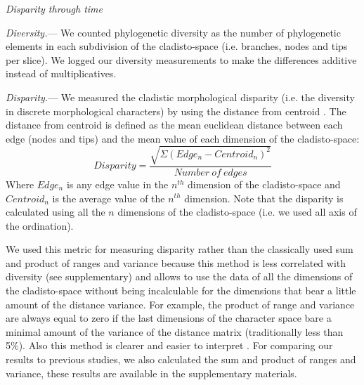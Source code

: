 \documentclass[12pt,letterpaper]{article}
\renewcommand{\subsection}[1]{%
\bigskip
\begin{center}
\begin{large}
\normalfont\itshape #1
\end{large}
\end{center}}
\renewcommand{\subsubsection}[1]{%
\vspace{2ex}
\noindent
\textit{#1.}---}
\begin{document}
\subsection{Disparity through time}
\subsubsection{Diversity}
We counted phylogenetic diversity as the number of phylogenetic elements in each subdivision of the cladisto-space (i.e. branches, nodes and tips per slice). We logged our diversity measurements to make the differences additive instead of multiplicatives.

\subsubsection{Disparity}
We measured the cladistic morphological disparity (i.e. the diversity in discrete morphological characters) by using the distance from centroid \citep{finlay2015morphological}. The distance from centroid is defined as the mean euclidean distance between each edge (nodes and tips) and the mean value of each dimension of the cladisto-space:
\begin{equation}
Disparity=\frac{\sqrt{\Sigma(Edge_{n}-Centroid_{n})^2}}{Number\ of\ edges}
\end{equation}
Where $Edge_{n}$ is any edge value in the $n^{th}$ dimension of the cladisto-space and $Centroid_{n}$ is the average value of the $n^{th}$ dimension. Note that the disparity is calculated using all the $n$ dimensions of the cladisto-space (i.e. we used all axis of the ordination).

We used this metric for measuring disparity rather than the classically used sum and product of ranges and variance \citep[e.g.][]{Wills1994,Foote29111996,Wesley-Hunt2005,Brusatte12092008,ruta2013} %
because this method is less correlated with diversity (see supplementary) and allows to use the data of all the dimensions of the cladisto-space without being incalculable for the dimensions that bear a little amount of the distance variance. For example, the product of range and variance are always equal to zero if the last dimensions of the character space bare a minimal amount of the variance of the distance matrix (traditionally less than 5\%). Also this method is clearer and easier to interpret \citep{finlay2015morphological}. For comparing our results to previous studies, we also calculated the sum and product of ranges and variance, these results are available in the supplementary materials.
\end{document}
